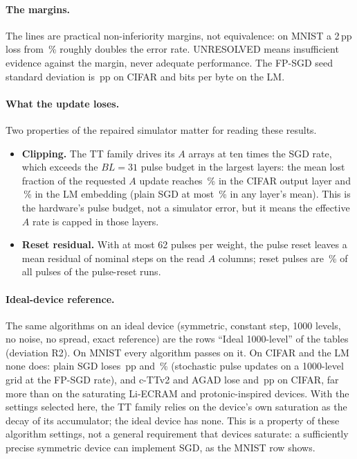 \paragraph{The margins.} The lines are practical non-inferiority margins, not equivalence: on MNIST a 2\,pp loss from
\RVMnistFp\,\% roughly doubles the error rate. UNRESOLVED means insufficient evidence against the margin, never adequate
performance. The FP-SGD seed standard deviation is \RVCifarFpSd\,pp on CIFAR and \RVLmFpSd{} bits per byte on the LM.

\paragraph{What the update loses.} Two properties of the repaired simulator matter for reading these results.
\begin{itemize}
\item \textbf{Clipping.} The TT family drives its $A$ arrays at ten times the SGD rate, which exceeds the $BL=31$ pulse budget
      in the largest layers: the mean lost fraction of the requested $A$ update reaches \RVLostCifarTtLayerMeanMaxPct\,\% in the
      CIFAR output layer and \RVLostLmTtLayerMeanMaxPct\,\% in the LM embedding (plain SGD at most \RVLostLmSgdLayerMeanMaxPct\,\%
      in any layer's mean). This is the hardware's pulse budget, not a simulator error, but it means the effective $A$ rate is
      capped in those layers.
\item \textbf{Reset residual.} With at most 62 pulses per weight, the pulse reset leaves a mean residual of
      \RVResetResidMean{} nominal steps on the read $A$ columns; reset pulses are \RVResetShareMean\,\% of all pulses of the
      pulse-reset runs.
\end{itemize}

\paragraph{Ideal-device reference.} The same algorithms on an ideal device (symmetric, constant step, 1000 levels, no noise, no
spread, exact reference) are the rows ``Ideal 1000-level'' of the tables (deviation R2). On MNIST every algorithm passes on it.
On CIFAR and the LM none does: plain SGD loses \RVCifarIdealOneZeroZeroZeroSgdVsFpGap\,pp and
\RVLmIdealOneZeroZeroZeroSgdVsFpGap\,\% (stochastic pulse updates on a 1000-level grid at the FP-SGD rate), and c-TTv2 and AGAD
lose \RVCifarIdealOneZeroZeroZeroCttvTwoVsFpGap{} and \RVCifarIdealOneZeroZeroZeroAgadVsFpGap\,pp on CIFAR, far more than on the
saturating Li-ECRAM and protonic-inspired devices. With the settings selected here, the TT family relies on the device's own
saturation as the decay of its accumulator; the ideal device has none. This is a property of these algorithm settings, not a
general requirement that devices saturate: a sufficiently precise symmetric device can implement SGD, as the MNIST row shows.


